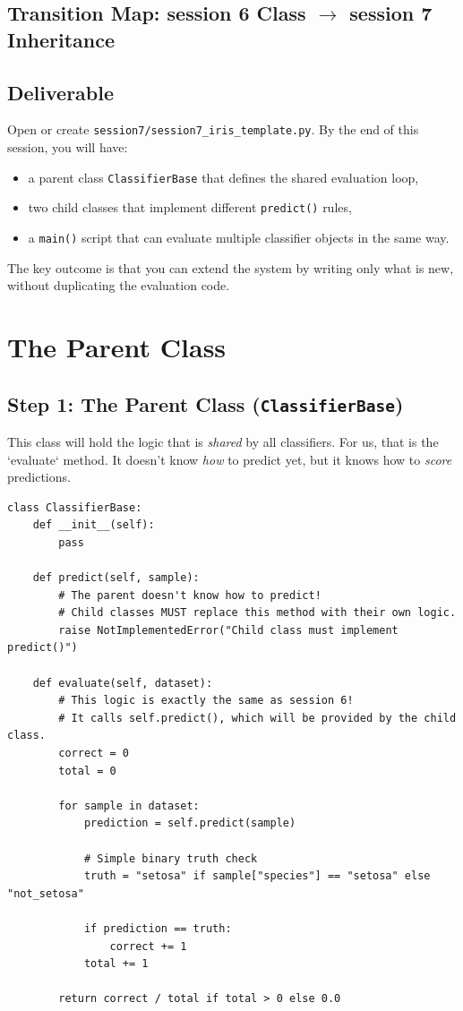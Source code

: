 \subsection{Transition Map: session 6 Class $\rightarrow$ session 7 Inheritance}



\subsection{Deliverable}
Open or create \texttt{session7/session7\_iris\_template.py}.
By the end of this session, you will have:
\begin{itemize}\setlength{\itemsep}{2pt}
    \item a parent class \texttt{ClassifierBase} that defines the shared evaluation loop,
    \item two child classes that implement different \texttt{predict()} rules,
    \item a \texttt{main()} script that can evaluate multiple classifier objects in the same way.
\end{itemize}
\noindent
The key outcome is that you can extend the system by writing only what is new, without duplicating the evaluation code.

\section{The Parent Class }


\subsection{Step 1: The Parent Class (\texttt{ClassifierBase})}
This class will hold the logic that is \textit{shared} by all classifiers.
For us, that is the `evaluate` method. It doesn't know \textit{how} to predict yet, but it knows how to \textit{score} predictions.

\begin{verbatim}
class ClassifierBase:
    def __init__(self):
        pass

    def predict(self, sample):
        # The parent doesn't know how to predict!
        # Child classes MUST replace this method with their own logic.
        raise NotImplementedError("Child class must implement predict()")

    def evaluate(self, dataset):
        # This logic is exactly the same as session 6!
        # It calls self.predict(), which will be provided by the child class.
        correct = 0
        total = 0
        
        for sample in dataset:
            prediction = self.predict(sample)
            
            # Simple binary truth check
            truth = "setosa" if sample["species"] == "setosa" else "not_setosa"
            
            if prediction == truth:
                correct += 1
            total += 1
            
        return correct / total if total > 0 else 0.0
\end{verbatim}

